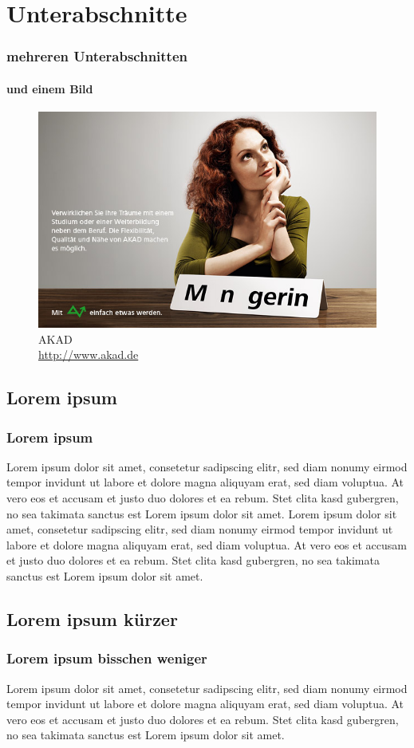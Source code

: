 \documentclass[xcolor=dvipsnames]{beamer}
\begin{document}
\section{Unterabschnitte}
\begin{frame}
  \frametitle{mehreren Unterabschnitten}
  \framesubtitle{und einem Bild}
	\begin{figure}
	\includegraphics[scale=0.4]{akad_bild1.jpg}
			\caption{AKAD \\ \tiny{\textcolor{gray}{\url{http://www.akad.de}}}}
	\end{figure}
\end{frame}

\subsection{Lorem ipsum}
\begin{frame}
  \frametitle{Lorem ipsum}
  Lorem ipsum dolor sit amet, consetetur sadipscing elitr, sed diam nonumy eirmod tempor invidunt ut labore et dolore magna aliquyam erat, sed diam voluptua. At vero eos et accusam et justo duo dolores et ea rebum. Stet clita kasd gubergren, no sea takimata sanctus est Lorem ipsum dolor sit amet. Lorem ipsum dolor sit amet, consetetur sadipscing elitr, sed diam nonumy eirmod tempor invidunt ut labore et dolore magna aliquyam erat, sed diam voluptua. At vero eos et accusam et justo duo dolores et ea rebum. Stet clita kasd gubergren, no sea takimata sanctus est Lorem ipsum dolor sit amet.
\end{frame}

\subsection{Lorem ipsum kürzer}
\begin{frame}
  \frametitle{Lorem ipsum bisschen weniger}
  Lorem ipsum dolor sit amet, consetetur sadipscing elitr, sed diam nonumy eirmod tempor invidunt ut labore et dolore magna aliquyam erat, sed diam voluptua. At vero eos et accusam et justo duo dolores et ea rebum. Stet clita kasd gubergren, no sea takimata sanctus est Lorem ipsum dolor sit amet.
\end{frame}
\end{document}
